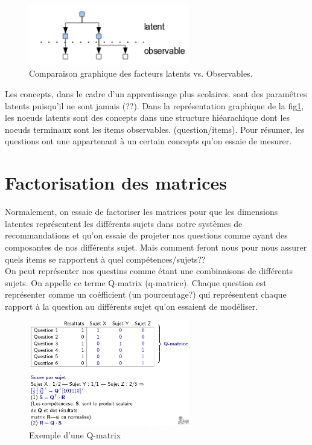 \documentclass[oneside]{book}
\begin{document}
\begin{figure}[!ht]
\centering
\includegraphics[width = 7cm]{latent_observable.png}
\caption{Comparaison graphique des facteurs latents vs. Observables.}
\label{fig:latent_observable}
\end{figure}

Les concepts, dans le cadre d'un apprentissage plus scolaires. sont des paramêtres latents puisqu'il ne sont jamais (??). Dans la représentation graphique de la fig\ref{fig:latent_observable}, les noeuds latents sont des concepts dans une structure hiéarachique dont les noeuds terminaux sont les items observables. (question/items). Pour résumer, les questions ont une appartenant à un certain concepts qu'on essaie de mesurer.
\section{Factorisation des matrices}
Normalement, on essaie de factoriser les matrices pour que les dimensions latentes représentent les différents sujets dans notre systèmes de recommandations et qu'on essaie de projeter nos questions comme ayant des composantes de nos différents sujet. Mais comment feront nous pour nous assurer quels items se rapportent à quel compétences/sujets??\\

On peut représenter nos questins comme étant une combinaisons de différents sujets. On appelle ce terme Q-matrix (q-matrice). Chaque question est représenter comme un coéfficient (un pourcentage?) qui représentent chaque rapport à la question au différents sujet qu'on essaient de modéliser.\\

\begin{figure}
\centering
\includegraphics[width = 7cm]{q_matrix.png}
\caption{Exemple d'une Q-matrix}
\label{fig:q_matrix}
\end{figure}
\end{document}

